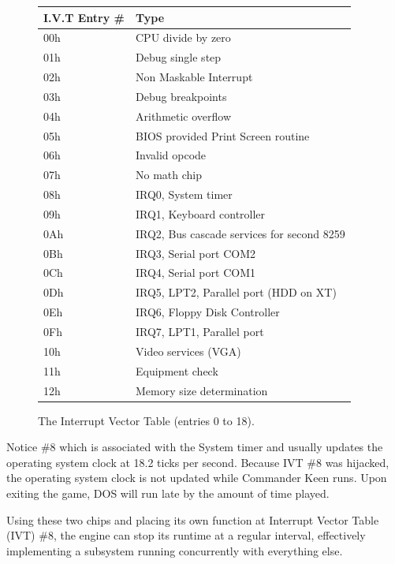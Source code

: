 \documentclass[book.tex]{subfiles}
\begin{document}
\begin{figure}[H]
	\centering
	\begin{tabularx}{\textwidth}{ l p{}  }
	  \toprule
	  \textbf{I.V.T Entry \#} & \textbf{Type} \\ \bottomrule

	  00h	&	CPU divide by zero \\
01h	&	Debug single step \\
02h	&	Non Maskable Interrupt \\
03h	&	Debug breakpoints \\
04h	&	Arithmetic overflow \\
05h	&	BIOS provided Print Screen routine \\
06h	&	Invalid opcode \\
07h	&	No math chip \\
08h & IRQ0, System timer \\
09h & IRQ1, Keyboard controller \\
0Ah & IRQ2, Bus cascade services for second 8259 \\
0Bh & IRQ3, Serial port COM2 \\ 
0Ch & IRQ4, Serial port COM1 \\
0Dh & IRQ5, LPT2, Parallel port (HDD on XT) \\
0Eh & IRQ6, Floppy Disk Controller \\
0Fh & IRQ7, LPT1, Parallel port \\
10h & Video services (VGA)\\
11h & Equipment check \\
12h & Memory size determination \\
		\bottomrule
	\end{tabularx}
	\caption{The Interrupt Vector Table (entries 0 to 18).}
\end{figure}
Notice \#8 which is associated with the System timer and usually updates the operating system clock at 18.2 ticks per second. Because IVT \#8 was hijacked, the operating system clock is not updated while Commander Keen runs. Upon exiting the game, DOS will run late by the amount of time played.\\
\par
Using these two chips and placing its own function at Interrupt Vector Table (IVT) \#8, the engine can stop its runtime at a regular interval, effectively implementing a subsystem running concurrently with everything else.\\
\par
\end{document}
